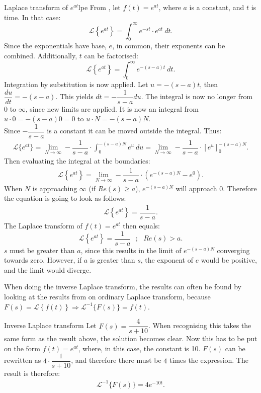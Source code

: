 \begin{example}{Laplace transform of $e^{at}$}{lpe}
From , let $f(t)=e^{at}$, where $a$ is a constant, and $t$ is time. In that case:
$$\mathcal{L} \left\{e^{at} \right\}=\int_{0}^{\infty} e^{-st}\cdot e^{at}\ dt.$$
Since the exponentials have base, $e$, in common, their exponents can be combined. Additionally, $t$ can be factorised:
$$\mathcal{L} \left\{e^{at} \right\}=\int_{0}^{\infty} e^{-(s-a)t}\ dt.$$
Integration by substitution is now applied. Let $u = -(s-a)t$, then $\dfrac{du}{dt}=-(s-a)$. This yields $dt=-\dfrac{1}{s-a}du$. The integral is now no longer from 0 to $\infty$, since new limits are applied. It is now an integral from $u \cdot 0=-(s-a)0=0$ to $u\cdot N=-(s-a)N$.
\\
Since $-\dfrac{1}{s-a}$ is a constant it can be moved outside the integral. Thus:
\begin{align*}
\mathcal{L}\{e^{at}\}=\lim_{N \to \infty} -\dfrac{1}{s-a} \cdot \int_{0}^{-(s-a)N} e^{u} \ du = \lim_{N \to \infty} -\dfrac{1}{s-a} \cdot \left[e^{u} \right]_{0}^{-(s-a)N}.
\end{align*}
Then evaluating the integral at the boundaries:
\begin{align*}
\mathcal{L} \left\{e^{at} \right\} =\lim_{N \to \infty} -\dfrac{1}{s-a}\cdot (e^{-(s-a)N}-e^{0}).
\end{align*}
When $N$ is approaching $\infty$ (if $Re(s) \geq a$), $e^{-(s-a)N}$ will approach $0$. Therefore the equation is going to look as follows:
\begin{align*}
\mathcal{L} \left\{e^{at} \right\} = \dfrac{1}{s-a}.
\end{align*}
The Laplace transform of $f(t)=e^{at}$ then equals:
$$\mathcal{L} \left\{e^{at} \right\} =\dfrac{1}{s-a} \ \ \ ;\ \ \ Re(s)>a.$$
$s$ must be greater than $a$, since this results in the limit of $e^{-(s-a)N}$ converging towards zero. However, if $a$ is greater than $s$, the exponent of $e$ would be positive, and the limit would diverge.
\end{example}
\noindent When doing the inverse Laplace transform, the results can often be found by looking at the results from on ordinary Laplace transform, because $F(s) = \mathcal{L}\left\{f(t)\right\} \Rightarrow\mathcal{L}^{-1}\big\{ F(s)\big\} = f(t)$.
\\
\begin{example}{Inverse Laplace transform}{}
Let $F(s) = \dfrac{4}{s+10}$. When recognising this takes the same form as the result above, the solution becomes clear. Now this has to be put on the form $f(t)=e^{at}$, where, in this case, the constant is 10. $F(s)$ can be rewritten as $4 \cdot \dfrac{1}{s+10}$, and therefore there must be $4$ times the expression. The result is therefore:
\begin{align*}
\mathcal{L}^{-1} \big\{F(s) \big\} = 4e^{-10t}.
\end{align*}
\end{example}
